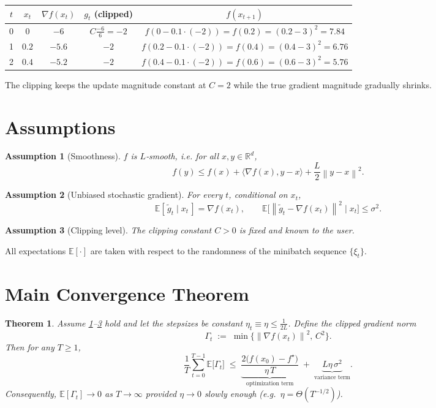 \documentclass{article}
\newtheorem{theorem}{Theorem}
\newtheorem{assumption}{Assumption}
\newcommand{\EE}{\mathbb{E}}
\newcommand{\norm}[1]{\left\lVert #1\right\rVert}
\begin{document}
\begin{center}
\begin{tabular}{c|c|c|c|c}
$t$ & $x_t$ & $\nabla f(x_t)$ & $g_t$ (clipped) & $f(x_{t+1})$ \\ \hline
0 & $0$ & $-6$ & $C\frac{-6}{6}= -2$ & $f(0-0.1\cdot(-2))=f(0.2)= (0.2-3)^2=7.84$\\
1 & $0.2$ & $-5.6$ & $-2$ & $f(0.2-0.1\cdot(-2))=f(0.4)= (0.4-3)^2=6.76$\\
2 & $0.4$ & $-5.2$ & $-2$ & $f(0.4-0.1\cdot(-2))=f(0.6)= (0.6-3)^2=5.76$
\end{tabular}
\end{center}
The clipping keeps the update magnitude constant at $C=2$ while the true gradient magnitude gradually shrinks.

\newpage

\section*{Assumptions}
\begin{assumption}[Smoothness]\label{ass:smooth}
$f$ is $L$‑smooth, i.e. for all $x,y\in\mathbb{R}^d$,
\[
f(y)\le f(x)+\langle\nabla f(x),y-x\rangle+\frac{L}{2}\norm{y-x}^2 .
\]
\end{assumption}
\begin{assumption}[Unbiased stochastic gradient]\label{ass:unbiased}
For every $t$, conditional on $x_t$,
\[
\EE[\,\tilde g_t\mid x_t\,]=\nabla f(x_t),\qquad
\EE\bigl[\norm{\tilde g_t-\nabla f(x_t)}^2\mid x_t\bigr]\le\sigma^2 .
\]
\end{assumption}
\begin{assumption}[Clipping level]\label{ass:clip}
The clipping constant $C>0$ is fixed and known to the user.
\end{assumption}
All expectations $\EE[\cdot]$ are taken with respect to the randomness of the minibatch sequence $\{\xi_t\}$.

\section*{Main Convergence Theorem}
\begin{theorem}\label{thm:main}
Assume \ref{ass:smooth}–\ref{ass:clip} hold and let the stepsizes be constant $\eta_t\equiv\eta\le\frac{1}{2L}$.
Define the \emph{clipped gradient norm} 
\[
\Gamma_t\;:=\;\min\{\norm{\nabla f(x_t)}^2,\,C^2\}.
\]
Then for any $T\ge1$,
\[
\frac{1}{T}\sum_{t=0}^{T-1}\EE\bigl[\Gamma_t\bigr]
\;\le\;
\underbrace{\frac{2\bigl(f(x_0)-f^\star\bigr)}{\eta\,T}}_{\text{optimization term}}
\;+\;
\underbrace{L\eta\,\sigma^2}_{\text{variance term}} .
\tag{3}
\]
Consequently, $\EE[\Gamma_t]\to0$ as $T\to\infty$ provided $\eta\to0$ slowly enough (e.g.\ $\eta=\Theta(T^{-1/2})$).
\end{theorem}
\end{document}
